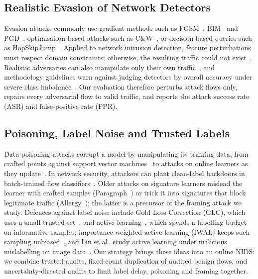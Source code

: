\documentclass[conference]{IEEEtran}
\begin{document}
\subsection{Realistic Evasion of Network Detectors}
Evasion attacks commonly use gradient methods such as
FGSM~\cite{goodfellow2015fgsm}, BIM~\cite{kurakin2017bim} and
PGD~\cite{madry2018pgd}, optimisation-based attacks such as
C\&W~\cite{carlini2017cw}, or decision-based queries such as
HopSkipJump~\cite{chen2020hsj}. Applied to network intrusion detection, feature
perturbations must respect domain constraints; otherwise, the resulting traffic
could not exist~\cite{pierazzi2020problemspace}. Realistic adversaries can also
manipulate only their own traffic~\cite{apruzzese2022realistic}, and
methodology guidelines warn against judging detectors by overall accuracy under
severe class imbalance~\cite{arp2022dosanddonts}. Our evaluation therefore
perturbs attack flows only, repairs every adversarial flow to valid traffic, and
reports the attack success rate (ASR) and false-positive rate (FPR).

\subsection{Poisoning, Label Noise and Trusted Labels}
Data poisoning attacks corrupt a model by manipulating its training data, from
crafted points against support vector machines~\cite{biggio2012poisoning} to
attacks on online learners as they update~\cite{zhang2020online}. In network
security, attackers can plant clean-label backdoors in batch-trained flow
classifiers~\cite{severi2023poisoning}. Older attacks on signature learners
mislead the learner with crafted samples
(Paragraph~\cite{newsome2006paragraph}) or trick it into signatures that block
legitimate traffic (Allergy~\cite{chung2006allergy}); the latter is a precursor
of the framing attack we study. Defences against label noise include Gold Loss
Correction (GLC), which uses a small trusted set~\cite{hendrycks2018glc}, and
active learning~\cite{settles2009active}, which spends a labelling budget on
informative samples; importance-weighted active learning (IWAL) keeps such
sampling unbiased~\cite{beygelzimer2009iwal}, and Lin et al.\ study active
learning under malicious mislabelling on image data~\cite{lin2021activelearning}.
Our strategy brings these ideas into an online NIDS: we combine trusted audits,
fixed-count duplication of audited benign flows, and uncertainty-directed audits
to limit label delay, poisoning and framing together.
\end{document}
